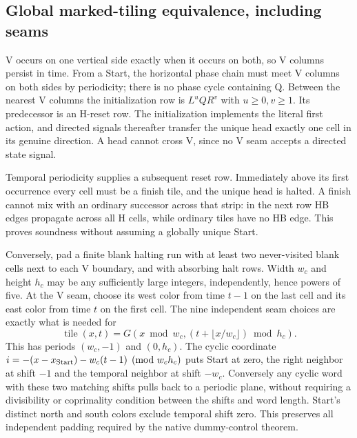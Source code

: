 \documentclass[11pt]{article}
\begin{document}
\subsection{Global marked-tiling equivalence, including seams}
V occurs on one vertical side exactly when it occurs on both, so V columns persist in time. From a Start, the horizontal phase chain must meet V columns on both sides by periodicity; there is no phase cycle containing Q. Between the nearest V columns the initialization row is $L^uQR^v$ with $u\ge0,v\ge1$. Its predecessor is an H-reset row. The initialization implements the literal first action, and directed signals thereafter transfer the unique head exactly one cell in its genuine direction. A head cannot cross V, since no V seam accepts a directed state signal.

Temporal periodicity supplies a subsequent reset row. Immediately above its first occurrence every cell must be a finish tile, and the unique head is halted. A finish cannot mix with an ordinary successor across that strip: in the next row HB edges propagate across all H cells, while ordinary tiles have no HB edge. This proves soundness without assuming a globally unique Start.

Conversely, pad a finite blank halting run with at least two never-visited blank cells next to each V boundary, and with absorbing halt rows. Width $w_c$ and height $h_c$ may be any sufficiently large integers, independently, hence powers of five. At the V seam, choose its west color from time $t-1$ on the last cell and its east color from time $t$ on the first cell. The nine independent seam choices are exactly what is needed for
\[
 \operatorname{tile}(x,t)=G(x\bmod w_c,(t+\lfloor x/w_c\rfloor)\bmod h_c).
\]
This has periods $(w_c,-1)$ and $(0,h_c)$. The cyclic coordinate
$i=-(x-x_{\rm Start})-w_c(t-1)\pmod{w_ch_c}$ puts Start at zero, the right neighbor at shift $-1$ and the temporal neighbor at shift $-w_c$. Conversely any cyclic word with these two matching shifts pulls back to a periodic plane, without requiring a divisibility or coprimality condition between the shifts and word length. Start's distinct north and south colors exclude temporal shift zero. This preserves all independent padding required by the native dummy-control theorem.
\end{document}
